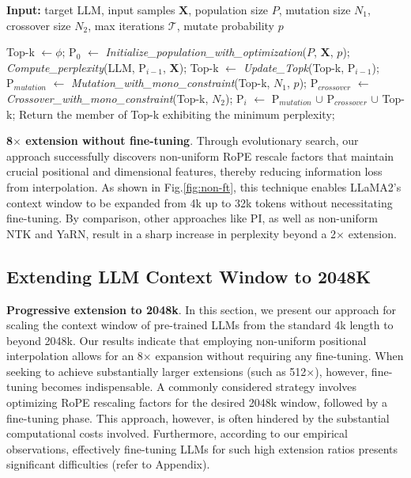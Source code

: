 \begin{algorithm}[t]
	\small
	\caption{The search algorithm}
	\textbf{Input:} target LLM, input samples $\mathbf{X}$, population size $P$, mutation size $N_1$, crossover size $N_2$, max iterations $\mathcal{T}$, mutate probability $p$\\

	\begin{algorithmic}[1]
		\label{alg:search}
		\STATE Top-k $\leftarrow \phi$;
		\STATE $\text{P}_0$ $\leftarrow$ \textit{Initialize\_population\_with\_optimization}($P$, $\mathbf{X}$, $p$);
		\STATE \textit{Compute\_perplexity}(LLM, $\text{P}_{i-1}$, $\mathbf{X}$);
		\STATE Top-k $\leftarrow$ \textit{Update\_Topk}(Top-k, $\text{P}_{i-1}$);
		\STATE $\text{P}_{mutation}$ $\leftarrow$ \textit{Mutation\_with\_mono\_constraint}(Top-k, $N_1$, $p$);
		\STATE $\text{P}_{crossover}$ $\leftarrow$ \textit{Crossover\_with\_mono\_constraint}(Top-k, $N_2$);
		\STATE $\text{P}_i$ $\leftarrow$ $\text{P}_{mutation}$ $\cup$ $\text{P}_{crossover}$ $\cup$ Top-k;
		\ENDFOR
		\STATE Return the member of Top-k exhibiting the minimum perplexity;
	\end{algorithmic}
\end{algorithm}

\textbf{8$\times$ extension without fine-tuning}. Through evolutionary search, our approach successfully discovers non-uniform RoPE rescale factors that maintain crucial positional and dimensional features, thereby reducing information loss from interpolation. As shown in Fig.\ref{fig:non-ft}, this technique enables LLaMA2's context window to be expanded from 4k up to 32k tokens without necessitating fine-tuning. By comparison, other approaches like PI, as well as non-uniform NTK and YaRN, result in a sharp increase in perplexity beyond a 2$\times$ extension.

\subsection{Extending LLM Context Window to 2048K}
\label{sec:extendto2048k}

\textbf{Progressive extension to 2048k}. In this section, we present our approach for scaling the context window of pre-trained LLMs from the standard 4k length to beyond 2048k. Our results indicate that employing non-uniform positional interpolation allows for an 8$\times$ expansion without requiring any fine-tuning. When seeking to achieve substantially larger extensions (such as 512$\times$), however, fine-tuning becomes indispensable. A commonly considered strategy involves optimizing RoPE rescaling factors for the desired 2048k window, followed by a fine-tuning phase. This approach, however, is often hindered by the substantial computational costs involved. Furthermore, according to our empirical observations, effectively fine-tuning LLMs for such high extension ratios presents significant difficulties (refer to Appendix).

